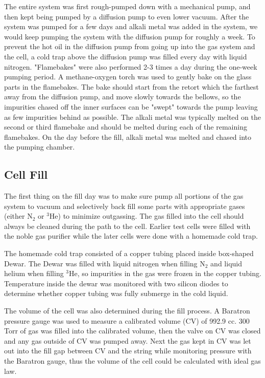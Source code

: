 The entire system was first rough-pumped down with a mechanical pump, and then kept being pumped by a diffusion pump to even lower vacuum. After the system was pumped for a few days and alkali metal was added in the system, we would keep pumping the system with the diffusion pump for roughly a week. To prevent the hot oil in the diffusion pump from going up into the gas system and the cell, a cold trap above the diffusion pump was filled every day with liquid nitrogen. "Flamebakes" were also performed 2-3 times a day during the one-week pumping period. A methane-oxygen torch was used to gently bake on the glass parts in the flamebakes. The bake should start from the retort which the farthest away from the diffusion pump, and move slowly towards the bellows, so the impurities chased off the inner surfaces can be "swept" towards the pump leaving as few impurities behind as possible. The alkali metal was typically melted on the second or third flamebake and should be melted during each of the remaining flamebakes. On the day before the fill, alkali metal was melted and chased into the pumping chamber.

\subsection{Cell Fill}

The first thing on the fill day was to make sure pump all portions of the gas system to vacuum and selectively back fill some parts with appropriate gases (either N$_2$ or $^{3}$He) to minimize outgassing. The gas filled into the cell should always be cleaned during the path to the cell. Earlier test cells were filled with the noble gas purifier while the later cells were done with a homemade cold trap.

The homemade cold trap consisted of a copper tubing placed inside box-shaped Dewar. The Dewar was filled with liquid nitrogen when filling N$_2$ and liquid helium when filling $^{3}$He, so impurities in the gas were frozen in the copper tubing. Temperature inside the dewar was monitored with two silicon diodes to determine whether copper tubing was fully submerge in the cold liquid.

The volume of the cell was also determined during the fill process. A Baratron pressure gauge was used to measure a calibrated volume (CV) of 992.9 cc. 300 Torr of gas was filled into the calibrated volume, then the valve on CV was closed and any gas outside of CV was pumped away. Next the gas kept in CV was let out into the fill gap between CV and the string while monitoring pressure with the Baratron gauge, thus the volume of the cell could be calculated with ideal gas law.

